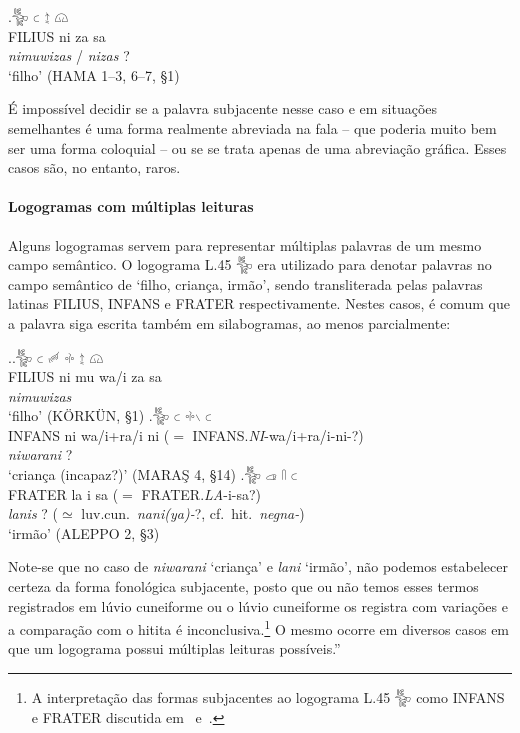 \exg.\Large 𔐰 \Large 𔗐 \Large 𔖪 \Large 𔗔\\
FILIUS ni za sa\\
\emph{nimuwizas} \slash{} \emph{nizas}{ }?\\
`filho' (HAMA 1–3, 6–7, §1)

É impossível decidir se a palavra subjacente nesse caso e em situações
semelhantes é uma forma realmente abreviada na fala  -- que poderia muito bem ser
uma forma coloquial -- ou se se trata apenas de uma abreviação gráfica.
Esses casos são, no entanto, raros.

\paragraph{Logogramas com múltiplas leituras}
Alguns logogramas servem para representar múltiplas palavras de um mesmo campo
semântico.
O logograma L.45 𔐰 era utilizado para denotar palavras no campo semântico de
`filho, criança, irmão', sendo transliterada pelas palavras latinas FILIUS,
INFANS e FRATER respectivamente. Nestes casos, é comum que a palavra siga
escrita também em silabogramas, ao menos parcialmente:

\ex.\ag.\Large 𔐰 \Large 𔗐 \Large 𔑿 \Large 𔗬 \Large 𔖪 \Large 𔗔\\
FILIUS ni mu wa\slash{}i za sa\\
\emph{nimuwizas} \\
`filho' (KÖRKÜN, §1)
\bg.\Large 𔐰 \Large 𔗐 \Large 𔗬𔖱 \Large 𔗐\\
INFANS ni wa\slash{}i+ra\slash{}i ni ($=$ INFANS.\emph{NI}-wa/i+ra/i-ni-?)\\
\emph{niwarani}{ }? \\
`criança (incapaz?)' (MARAŞ 4, §14)
\bg.\Large 𔐰 \Large 𔓊 \Large 𔓯 \Large 𔗐\\
FRATER la i sa ($=$ FRATER.\emph{LA}-i-sa?)\\
\emph{lanis}{ }?  ($\simeq$ luv.cun.\ \emph{nani{(ya)}-}?, cf.\ hit.\ \emph{negna-})\\
`irmão' (ALEPPO 2, §3)


\noindent Note-se que no caso de \emph{niwarani} `criança' e \emph{lani} `irmão',
não podemos estabelecer certeza da forma fonológica subjacente, posto que ou não
temos esses termos registrados em lúvio cuneiforme ou o lúvio cuneiforme os
registra com variações e a comparação com o hitita
é inconclusiva.\footnote{A interpretação das formas subjacentes ao logograma
	L.45 𔐰 como INFANS e FRATER discutida em~\citet[143--6]{Hawkins1980}
	e~\citet[387]{Yakubovich2010b}.}
O mesmo ocorre em diversos casos em que um logograma possui múltiplas leituras
possíveis.''

